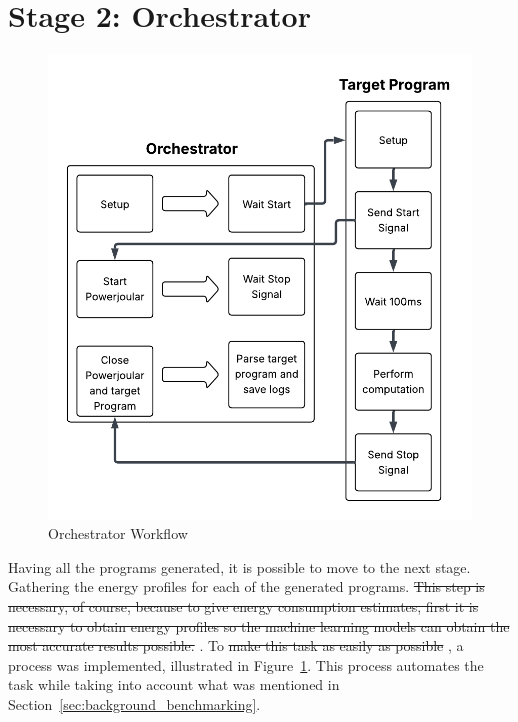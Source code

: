 

\section{Stage 2: Orchestrator} \label{sec:work_stage2_orchestrator}

\begin{figure}[htbp]
  \centering
  \includegraphics[scale = 0.7]{figures/orchestrators_process.pdf}
  \caption{Orchestrator Workflow}
  \label{fig:orchestrators_workflow}
\end{figure}


Having all the programs generated, it is possible to move to the next stage. Gathering the energy profiles for each of the generated programs. \st{This step is necessary, of course, because to give energy consumption estimates, first it is necessary to obtain energy profiles so the machine learning models can obtain the most accurate results possible.}
. To \st{make this task as easily as possible} , a process was implemented, illustrated in Figure~\ref{fig:orchestrators_workflow}. This process automates the task while taking into account what was mentioned in Section~\ref{sec:background_benchmarking}.

